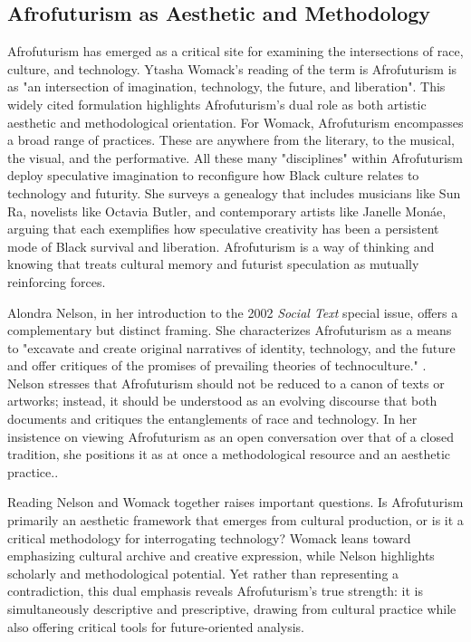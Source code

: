 \subsection{Afrofuturism as Aesthetic and Methodology}
Afrofuturism has emerged as a critical site for examining the intersections of race, culture, and technology. Ytasha Womack's reading of the term is Afrofuturism is as "an intersection of imagination, technology, the future, and liberation"\parencite[p. 9]{Womack_2013}. This widely cited formulation highlights Afrofuturism’s dual role as both artistic aesthetic and methodological orientation. For Womack, Afrofuturism encompasses a broad range of practices. These are anywhere from the literary, to the musical, the visual, and the performative. All these many "disciplines" within Afrofuturism deploy speculative imagination to reconfigure how Black culture relates to technology and futurity. She surveys a genealogy that includes musicians like Sun Ra, novelists like Octavia Butler, and contemporary artists like Janelle Monáe, arguing that each exemplifies how speculative creativity has been a persistent mode of Black survival and liberation. Afrofuturism is a way of thinking and knowing that treats cultural memory and futurist speculation as mutually reinforcing forces.  

Alondra Nelson, in her introduction to the 2002 \emph{Social Text} special issue, offers a complementary but distinct framing. She characterizes Afrofuturism as a means to "excavate and create original narratives of identity, technology, and the future and offer critiques of the promises of prevailing theories of technoculture." \parencite[p. 9]{Nelson_2002}. Nelson stresses that Afrofuturism should not be reduced to a canon of texts or artworks; instead, it should be understood as an evolving discourse that both documents and critiques the entanglements of race and technology. In her insistence on viewing Afrofuturism as an open conversation over that of a closed tradition, she positions it as at once a methodological resource and an aesthetic practice..  

Reading Nelson and Womack together raises important questions. Is Afrofuturism primarily an aesthetic framework that emerges from cultural production, or is it a critical methodology for interrogating technology? Womack leans toward emphasizing cultural archive and creative expression, while Nelson highlights scholarly and methodological potential. Yet rather than representing a contradiction, this dual emphasis reveals Afrofuturism’s true strength: it is simultaneously descriptive and prescriptive, drawing from cultural practice while also offering critical tools for future-oriented analysis.  

